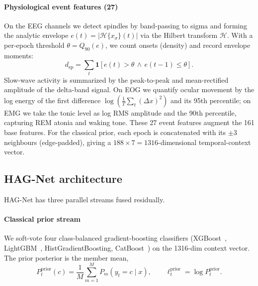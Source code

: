 \documentclass[journal]{IEEEtran}
\begin{document}
\paragraph{Physiological event features (27)}
On the EEG channels we detect spindles by band-passing to sigma and forming the
analytic envelope $e(t)=|\mathcal{H}\{x_\sigma\}(t)|$ via the Hilbert transform
$\mathcal{H}$. With a per-epoch threshold $\theta=Q_{90}(e)$, we count onsets
(density) and record envelope moments:
\begin{equation}
d_{\mathrm{sp}}=\sum_{t}\mathbf{1}\!\left[e(t)>\theta \,\wedge\, e(t\!-\!1)\le\theta\right].
\end{equation}
Slow-wave activity is summarized by the peak-to-peak and mean-rectified amplitude
of the delta-band signal. On EOG we quantify ocular movement by the log energy of
the first difference $\log(\tfrac{1}{T}\sum_t(\Delta x)^2)$ and its 95th
percentile; on EMG we take the tonic level as log RMS amplitude and the 90th
percentile, capturing REM atonia and waking tone. These 27 event features augment
the 161 base features. For the classical prior, each epoch is concatenated with its
$\pm3$ neighbours (edge-padded), giving a $188\times7=1316$-dimensional
temporal-context vector.

\subsection{HAG-Net architecture}
\label{sec:arch}
HAG-Net has three parallel streams fused residually.

\paragraph{Classical prior stream}
We soft-vote four class-balanced gradient-boosting classifiers
(XGBoost~\cite{chen2016xgboost}, LightGBM~\cite{ke2017lightgbm},
HistGradientBoosting, CatBoost~\cite{prokhorenkova2018catboost}) on the 1316-dim
context vector. The prior posterior is the member mean,
\begin{equation}
P^{\mathrm{prior}}_t(c)=\frac{1}{M}\sum_{m=1}^{M}P_m(y_t\!=\!c\mid x),
\qquad \ell^{\mathrm{prior}}_t=\log P^{\mathrm{prior}}_t .
\end{equation}
\end{document}
